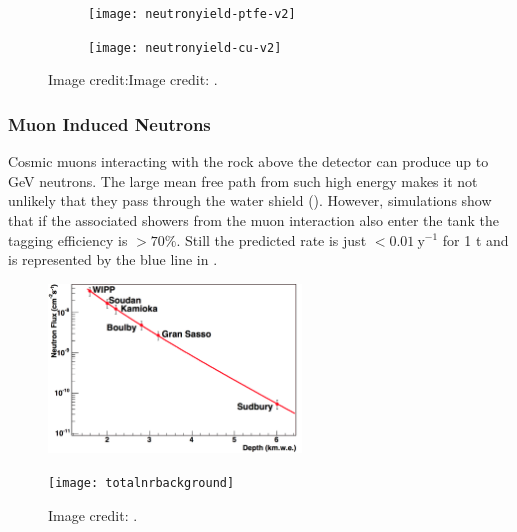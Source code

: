 \begin{figure}
    \centering
    \begin{subfigure}[t]{0.5\textwidth}
        \centering
        \texttt{[image: neutronyield-ptfe-v2]}
    \end{subfigure}%
    \begin{subfigure}[t]{0.5\textwidth}
        \centering
        \texttt{[image: neutronyield-cu-v2]}
    \end{subfigure}
    \caption{Image credit:Image credit: .}
	\label{fig:backgrounds_nuclear_radiogenic_rates}
\end{figure}



\subsubsection{Muon Induced Neutrons}
\label{subsubsec:backgrounds_nuclear_muon_induced}
Cosmic muons interacting with the rock above the detector can produce up to GeV neutrons.  The large mean free path from such high energy
makes it not unlikely that they pass through the water shield ().  However, simulations show that if
the associated showers from the muon interaction also enter the tank the tagging efficiency is $> 70\%$.  Still the predicted rate is just
$< 0.01\ \mathrm{y^{-1}}$ for 1 t and is represented by the blue line in .

\begin{figure}
\centering
\includegraphics[width=0.6\textwidth]{MuonFluxOverDepth}
\label{fig:backgrounds_nuclear_muon_induced_flux}
\end{figure}

\begin{figure}
\centering
\texttt{[image: totalnrbackground]}
\caption{Image credit: .}
\label{fig:backgrounds_nuclear_muon_induced_nr_rate}
\end{figure}



